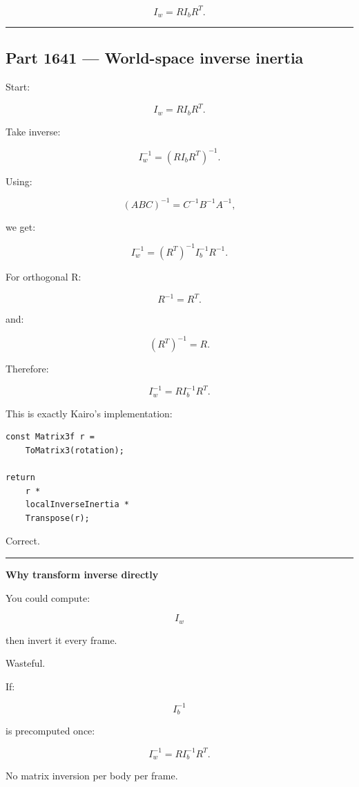 \[
I_w=
RI_bR^T.
\]

\begin{center}\rule{0.5\linewidth}{0.5pt}\end{center}

\subsection{Part 1641 --- World-space inverse inertia}\label{06-engine-ii-ch035-part-1641-world-space-inverse-inertia}

Start:

\[
I_w
=
RI_bR^T.
\]

Take inverse:

\[
I_w^{-1}
=
(RI_bR^T)^{-1}.
\]

Using:

\[
(ABC)^{-1}
=
C^{-1}B^{-1}A^{-1},
\]

we get:

\[
I_w^{-1}
=
(R^T)^{-1}
I_b^{-1}
R^{-1}.
\]

For orthogonal R:

\[
R^{-1}=R^T.
\]

and:

\[
(R^T)^{-1}=R.
\]

Therefore:

\[
\boxed{
I_w^{-1}
=
R
I_b^{-1}
R^T.
}
\]

This is exactly Kairo's implementation:

\begin{verbatim}
const Matrix3f r =
    ToMatrix3(rotation);

return
    r *
    localInverseInertia *
    Transpose(r);
\end{verbatim}

Correct.

\begin{center}\rule{0.5\linewidth}{0.5pt}\end{center}

\textbf{Why transform inverse directly}

You could compute:

\[
I_w
\]

then invert it every frame.

Wasteful.

If:

\[
I_b^{-1}
\]

is precomputed once:

\[
I_w^{-1}
=
RI_b^{-1}R^T.
\]

No matrix inversion per body per frame.

